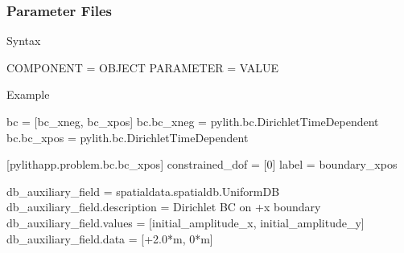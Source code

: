 \documentclass[aspectratio=169]{beamer}
\begin{document}
\begin{frame}[fragile]
  \frametitle{Parameter Files}

  Syntax\vspace*{-8pt}%
  \begin{cfgcode}
    COMPONENT = OBJECT
    PARAMETER = VALUE
  \end{cfgcode}

  \vspace*{-4pt}%
  Example\vspace*{-8pt}%
  \begin{cfgcode}
      bc = [bc_xneg, bc_xpos]
      bc.bc_xneg = pylith.bc.DirichletTimeDependent
      bc.bc_xpos = pylith.bc.DirichletTimeDependent

      [pylithapp.problem.bc.bc_xpos]
      constrained_dof = [0]
      label = boundary_xpos

      db_auxiliary_field = spatialdata.spatialdb.UniformDB
      db_auxiliary_field.description = Dirichlet BC on +x boundary
      db_auxiliary_field.values = [initial_amplitude_x, initial_amplitude_y]
      db_auxiliary_field.data = [+2.0*m, 0*m]
    \end{cfgcode}
  
\end{frame}
\end{document}
